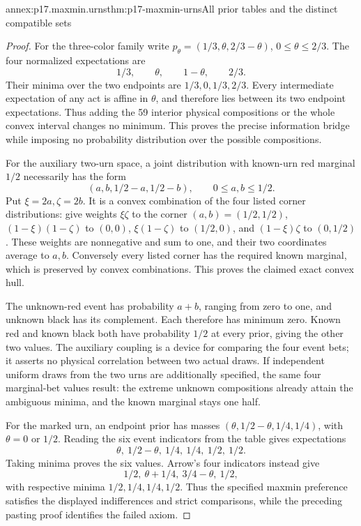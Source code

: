 \begin{annexitem}{annex:p17.maxmin.urns}{thm:p17-maxmin-urns}{All prior tables and the distinct compatible sets}
\begin{proof}
For the three-color family write
\(p_\theta=(1/3,\theta,2/3-\theta)\),
\(0\leq\theta\leq2/3\).
The four normalized expectations are
\[
             1/3,\qquad \theta,\qquad 1-\theta,\qquad 2/3.
\]
Their minima over the two endpoints
are \(1/3,0,1/3,2/3\).
Every intermediate expectation of any
act is affine in \(\theta\), and
therefore lies between its two endpoint
expectations. Thus adding the 59 interior
physical compositions or the whole
convex interval changes no minimum.
This proves the precise information
bridge while imposing no probability
distribution over the possible
compositions.

For the auxiliary two-urn space,
a joint distribution with known-urn
red marginal \(1/2\) necessarily has
the form
\[
                    (a,b,1/2-a,1/2-b),
                              \qquad 0\leq a,b\leq1/2.
\]
Put \(\xi=2a,\zeta=2b\).
It is a convex combination of the
four listed corner distributions:
give weights \(\xi\zeta\) to the
corner \((a,b)=(1/2,1/2)\),
\((1-\xi)(1-\zeta)\) to \((0,0)\),
\(\xi(1-\zeta)\) to \((1/2,0)\),
and \((1-\xi)\zeta\) to \((0,1/2)\).
These weights are nonnegative and
sum to one, and their two coordinates
average to \(a,b\). Conversely every
listed corner has the required known
marginal, which is preserved by
convex combinations. This proves the
claimed exact convex hull.

The unknown-red event has probability
\(a+b\), ranging from zero to one,
and unknown black has its complement.
Each therefore has minimum zero.
Known red and known black both have
probability \(1/2\) at every prior,
giving the other two values.
The auxiliary coupling is a device
for comparing the four event bets;
it asserts no physical correlation
between two actual draws.
If independent uniform draws from
the two urns are additionally
specified, the same four marginal-bet
values result: the extreme unknown
compositions already attain the
ambiguous minima, and the known
marginal stays one half.

For the marked urn, an endpoint
prior has masses \((\theta,1/2-\theta,
1/4,1/4)\), with \(\theta=0\) or \(1/2\).
Reading the six event indicators
from the table gives expectations
\[
          \theta,\ 1/2-\theta,\ 1/4,\ 1/4,\ 1/2,\ 1/2.
\]
Taking minima proves the six values.
Arrow's four indicators instead give
\[
             1/2,\ \theta+1/4,\ 3/4-\theta,\ 1/2,
\]
with respective minima
\(1/2,1/4,1/4,1/2\). Thus the
specified maxmin preference satisfies
the displayed indifferences and
strict comparisons, while the
preceding pasting proof identifies
the failed axiom.


\end{proof}
\end{annexitem}
